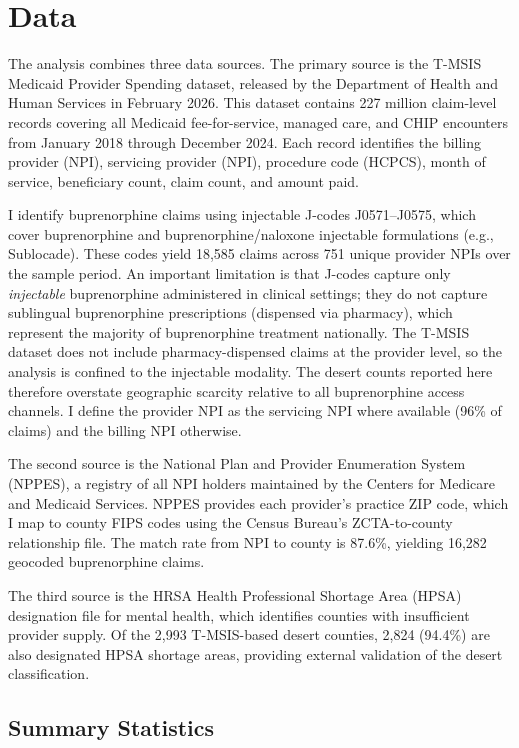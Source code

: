 \documentclass[12pt]{article}
\begin{document}
\section{Data}

The analysis combines three data sources. The primary source is the T-MSIS Medicaid Provider Spending dataset, released by the Department of Health and Human Services in February 2026. This dataset contains 227 million claim-level records covering all Medicaid fee-for-service, managed care, and CHIP encounters from January 2018 through December 2024. Each record identifies the billing provider (NPI), servicing provider (NPI), procedure code (HCPCS), month of service, beneficiary count, claim count, and amount paid.

I identify buprenorphine claims using injectable J-codes J0571--J0575, which cover buprenorphine and buprenorphine/naloxone injectable formulations (e.g., Sublocade). These codes yield 18,585 claims across 751 unique provider NPIs over the sample period. An important limitation is that J-codes capture only \textit{injectable} buprenorphine administered in clinical settings; they do not capture sublingual buprenorphine prescriptions (dispensed via pharmacy), which represent the majority of buprenorphine treatment nationally. The T-MSIS dataset does not include pharmacy-dispensed claims at the provider level, so the analysis is confined to the injectable modality. The desert counts reported here therefore overstate geographic scarcity relative to all buprenorphine access channels. I define the provider NPI as the servicing NPI where available (96\% of claims) and the billing NPI otherwise.

The second source is the National Plan and Provider Enumeration System (NPPES), a registry of all NPI holders maintained by the Centers for Medicare and Medicaid Services. NPPES provides each provider's practice ZIP code, which I map to county FIPS codes using the Census Bureau's ZCTA-to-county relationship file. The match rate from NPI to county is 87.6\%, yielding 16,282 geocoded buprenorphine claims.

The third source is the HRSA Health Professional Shortage Area (HPSA) designation file for mental health, which identifies counties with insufficient provider supply. Of the 2,993 T-MSIS-based desert counties, 2,824 (94.4\%) are also designated HPSA shortage areas, providing external validation of the desert classification.

\subsection{Summary Statistics}
\end{document}
